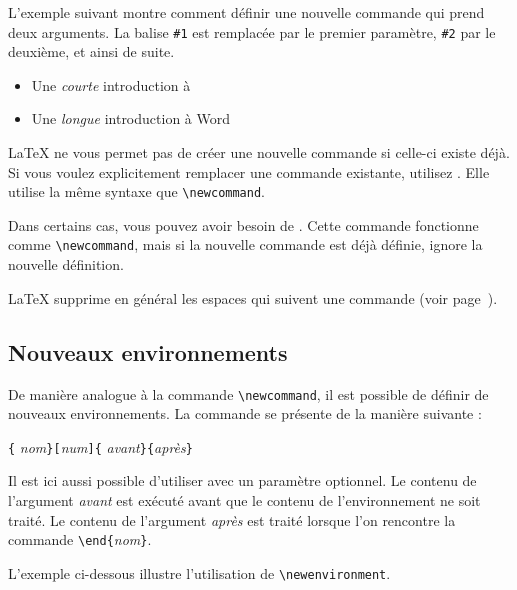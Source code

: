 L'exemple suivant montre comment définir une nouvelle commande qui
prend deux arguments. La balise \verb|#1| est remplacée par le premier
paramètre, \verb|#2| par le deuxième, et ainsi de suite.

\begin{example}
\newcommand{\uxil}[2]
    {Une \emph{#1}
     introduction à #2}
\begin{itemize}
  \item \uxil{courte}{\LaTeXe}
  \item \uxil{longue}{Word}
\end{itemize}
\end{example}

\LaTeX{} ne vous permet pas de créer une nouvelle commande si celle-ci
existe déjà. Si vous voulez explicitement remplacer une commande
existante, utilisez . Elle utilise la même syntaxe
que \verb|\newcommand|.

Dans certains cas, vous pouvez avoir besoin de
. Cette commande fonctionne comme
\verb|\newcommand|, mais si la nouvelle commande est déjà définie,
\LaTeXe{} ignore  la nouvelle définition.

\LaTeX{} supprime en général les espaces qui suivent une commande
(voir page~\pageref{whitespace}).

\subsection{Nouveaux environnements}

De manière analogue à la commande \verb|\newcommand|, il est possible
de définir de nouveaux environnements.  La commande
 se présente de la manière suivante :

\begin{lscommand}
\verb|{|%
       \emph{nom}\verb|}[|\emph{num}\verb|]{|%
       \emph{avant}\verb|}{|\emph{après}\verb|}|
\end{lscommand}

Il est ici aussi possible d'utiliser
 avec un paramètre optionnel. Le contenu de
l'argument \emph{avant} est exécuté avant que le contenu de
l'environnement ne soit traité. Le contenu de l'argument \emph{après}
est traité lorsque l'on rencontre la commande
\verb|\end{|\emph{nom}\verb|}|.

L'exemple ci-dessous illustre l'utilisation de \verb|\newenvironment|.


